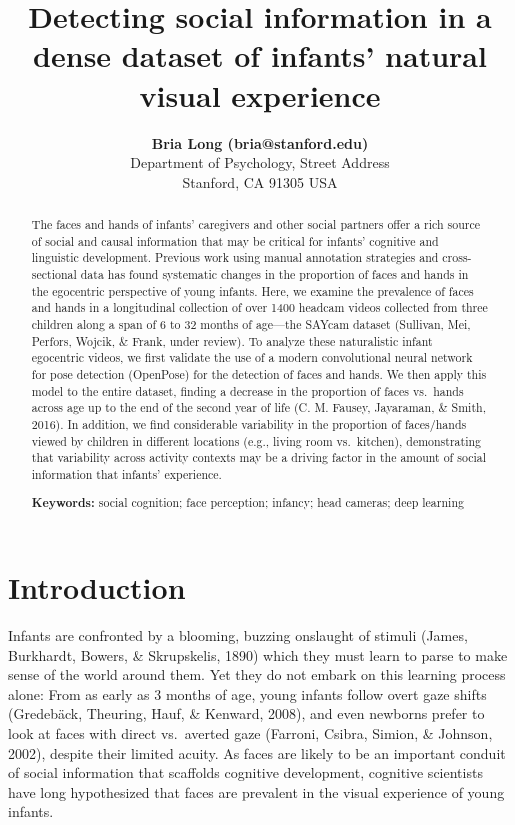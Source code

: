 \documentclass[10pt, letterpaper]{article}
\title{Detecting social information in a dense dataset of infants' natural
visual experience}
\author{{\large \bf Bria Long (bria@stanford.edu)}  \AND {\large \bf George Kachergis (kachergis@stanford.edu)}  \AND {\large \bf Ketan Jay Agarwal (agrawalk@stanford.edu)}  \AND {\large \bf Michael C. Frank (mcfrank@stanford.edu)} \\  Department of Psychology, Street Address \\ Stanford, CA 91305 USA}
\begin{document}
\maketitle

\begin{abstract}
The faces and hands of infants' caregivers and other social partners
offer a rich source of social and causal information that may be
critical for infants' cognitive and linguistic development. Previous
work using manual annotation strategies and cross-sectional data has
found systematic changes in the proportion of faces and hands in the
egocentric perspective of young infants. Here, we examine the prevalence
of faces and hands in a longitudinal collection of over 1400 headcam
videos collected from three children along a span of 6 to 32 months of
age---the SAYcam dataset (Sullivan, Mei, Perfors, Wojcik, \& Frank,
under review). To analyze these naturalistic infant egocentric videos,
we first validate the use of a modern convolutional neural network for
pose detection (OpenPose) for the detection of faces and hands. We then
apply this model to the entire dataset, finding a decrease in the
proportion of faces vs.~hands across age up to the end of the second
year of life (C. M. Fausey, Jayaraman, \& Smith, 2016). In addition, we
find considerable variability in the proportion of faces/hands viewed by
children in different locations (e.g., living room vs.~kitchen),
demonstrating that variability across activity contexts may be a driving
factor in the amount of social information that infants' experience.

\textbf{Keywords:}
social cognition; face perception; infancy; head cameras; deep learning
\end{abstract}

\newcommand{\wrapmf}[1]{#1}





\section{Introduction}\label{introduction}

Infants are confronted by a blooming, buzzing onslaught of stimuli
(James, Burkhardt, Bowers, \& Skrupskelis, 1890) which they must learn
to parse to make sense of the world around them. Yet they do not embark
on this learning process alone: From as early as 3 months of age, young
infants follow overt gaze shifts (Gredeb\wrapmf{\"{a}}ck, Theuring,
Hauf, \& Kenward, 2008), and even newborns prefer to look at faces with
direct vs.~averted gaze (Farroni, Csibra, Simion, \& Johnson, 2002),
despite their limited acuity. As faces are likely to be an important
conduit of social information that scaffolds cognitive development,
cognitive scientists have long hypothesized that faces are prevalent in
the visual experience of young infants.
\end{document}

